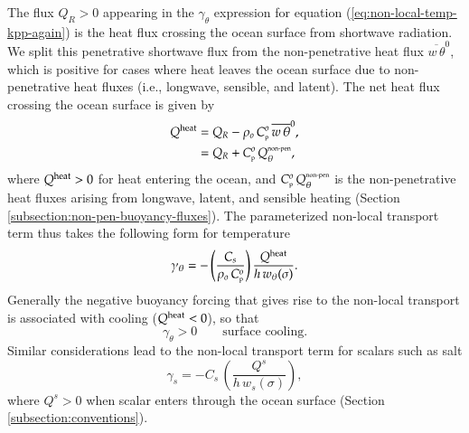 The flux $Q_{R}>0$ appearing
in the $\gamma_{\theta}$ expression for equation
(\ref{eq:non-local-temp-kpp-again}) is the heat flux crossing the
ocean surface from shortwave radiation.  We split this penetrative
shortwave flux from the non-penetrative heat flux $\overline{w \,
  \theta}^{0}$, which is positive for cases where heat leaves the
ocean surface due to non-penetrative heat fluxes (i.e., longwave,
sensible, and latent).  The net heat flux crossing the ocean surface
is given by
\begin{subequations}
\begin{align}
 Q^{\mbox{\scriptsize heat}} &= Q_{R} - \rho_{o} \, C_{\mbox{\tiny p}}^{o} \,  \overline{w \, \theta}^{0},
\label{eq:heat-flux-penetrative-and-non-penetrative}
 \\
 &=  Q_{R} + C_{\mbox{\tiny p}}^{o} \,  Q_{\theta}^{\mbox{\tiny non-pen}},
\end{align}
\end{subequations}
where $Q^{\mbox{\scriptsize heat}} > 0$ for heat entering the ocean,
and $C_{\mbox{\tiny p}}^{o} \, Q_{\theta}^{\mbox{\tiny non-pen}}$ is
the non-penetrative heat fluxes arising from longwave, latent, and
sensible heating (Section \ref{subsection:non-pen-buoyancy-fluxes}).
The parameterized non-local transport term thus takes the following
form for temperature
\begin{equation}
 \gamma_{\theta} = -\left(\frac{ C_{s}}{\rho_{o}  \, C_{\mbox{\tiny p}}^{o} } \right) 
  \frac{ Q^{\mbox{\scriptsize heat}} }{h \,  w_{\theta}(\sigma)}.  
\label{eq:non-local-temp-kpp-again-again}
\end{equation}
Generally the negative buoyancy forcing that gives rise to the
non-local transport is associated with cooling
($Q^{\mbox{\scriptsize heat}} < 0$), so that 
\begin{equation}
  \gamma_{\theta} > 0 \qquad \mbox{surface cooling}.
\label{eq:surface-cooling-gamma-theta}
\end{equation}
Similar considerations lead to the non-local transport term for
scalars such as salt 
\begin{equation}
 \gamma_{s} = -C_{s} \, \left( \frac{ Q^{s}  }{h \,  w_{s}(\sigma)} \right),  
\label{eq:non-local-scalar-kpp-again-again}
\end{equation}
where $Q^{s} > 0$ when scalar enters through the ocean surface
(Section \ref{subsection:conventions}).

